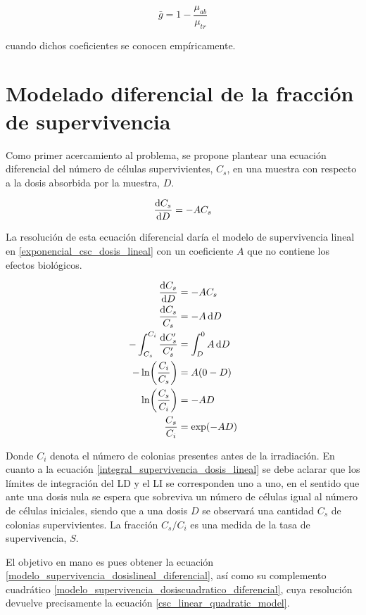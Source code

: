 \documentclass[12pt,letterpaper, oneside]{book}
\begin{document}
	$$\bar{g}=1-\frac{\mu_{ab}}{\mu_{tr}}$$
	
	\noindent cuando dichos coeficientes se conocen empíricamente. 
	
	\section{Modelado diferencial de la fracción de supervivencia}
	Como primer acercamiento al problema, se propone plantear una ecuación diferencial del número de células supervivientes, $C_s$, en una muestra con respecto a la dosis absorbida por la muestra, $D$.
	
	\begin{equation}
		\dv{C_s}{D}=-A C_s \label{modelo_supervivencia_dosislineal_diferencial}
	\end{equation}
	
	La resolución de esta ecuación diferencial daría el modelo de supervivencia lineal en \ref{exponencial_csc_dosis_lineal} con un coeficiente $A$ que no contiene los efectos biológicos.
	
	\begin{align}
		\nonumber \dv{C_s}{D}&=-A C_s\\
		\nonumber \frac{\dd{C_s}}{C_s}&=-A \dd{D}\\
		-\int_{C_s}^{C_i} \frac{\dd{C_s'}}{C_s'}&=\int_{D}^{0} A \dd{D}\label{integral_supervivencia_dosis_lineal}\\ 
		\nonumber -\ln(\frac{C_i}{C_s})&=A(0-D)\\
		\nonumber \ln(\frac{C_s}{C_i})&=-A D\\
		\nonumber \frac{C_s}{C_i}&=\exp(-A D)
	\end{align}
	 
	\noindent Donde $C_i$ denota el número de colonias presentes antes de la irradiación. En cuanto a la ecuación \ref{integral_supervivencia_dosis_lineal} se debe aclarar que los límites de integración del LD y el LI se corresponden uno a uno, en el sentido que ante una dosis nula se espera que sobreviva un número de células igual al número de células iniciales, siendo que a una dosis $D$ se observará una cantidad $C_s$ de colonias supervivientes. La fracción $C_s/C_i$ es una medida de la tasa de supervivencia, $S$. 
	
	El objetivo en mano es pues obtener la ecuación \ref{modelo_supervivencia_dosislineal_diferencial}, así como su complemento cuadrático \ref{modelo_supervivencia_dosiscuadratico_diferencial}, cuya resolución devuelve precisamente la ecuación \ref{csc_linear_quadratic_model}.
	
\end{document}
